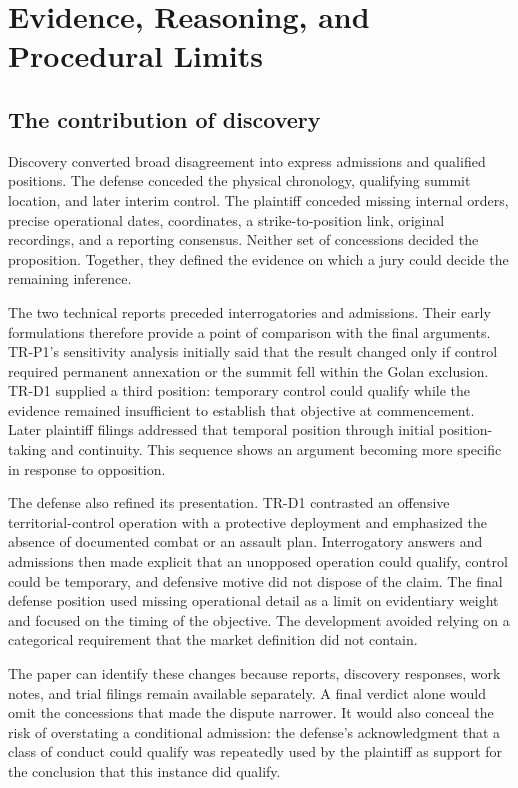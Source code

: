 \section{Evidence, Reasoning, and Procedural Limits}

\subsection{The contribution of discovery}

Discovery converted broad disagreement into express admissions and qualified positions.  The defense conceded the physical chronology, qualifying summit location, and later interim control.  The plaintiff conceded missing internal orders, precise operational dates, coordinates, a strike-to-position link, original recordings, and a reporting consensus.  Neither set of concessions decided the proposition.  Together, they defined the evidence on which a jury could decide the remaining inference.

The two technical reports preceded interrogatories and admissions.  Their early formulations therefore provide a point of comparison with the final arguments.  TR-P1's sensitivity analysis initially said that the result changed only if control required permanent annexation or the summit fell within the Golan exclusion.  TR-D1 supplied a third position: temporary control could qualify while the evidence remained insufficient to establish that objective at commencement.  Later plaintiff filings addressed that temporal position through initial position-taking and continuity.  This sequence shows an argument becoming more specific in response to opposition.

The defense also refined its presentation.  TR-D1 contrasted an offensive territorial-control operation with a protective deployment and emphasized the absence of documented combat or an assault plan.  Interrogatory answers and admissions then made explicit that an unopposed operation could qualify, control could be temporary, and defensive motive did not dispose of the claim.  The final defense position used missing operational detail as a limit on evidentiary weight and focused on the timing of the objective.  The development avoided relying on a categorical requirement that the market definition did not contain.

The paper can identify these changes because reports, discovery responses, work notes, and trial filings remain available separately.  A final verdict alone would omit the concessions that made the dispute narrower.  It would also conceal the risk of overstating a conditional admission: the defense's acknowledgment that a class of conduct could qualify was repeatedly used by the plaintiff as support for the conclusion that this instance did qualify.

